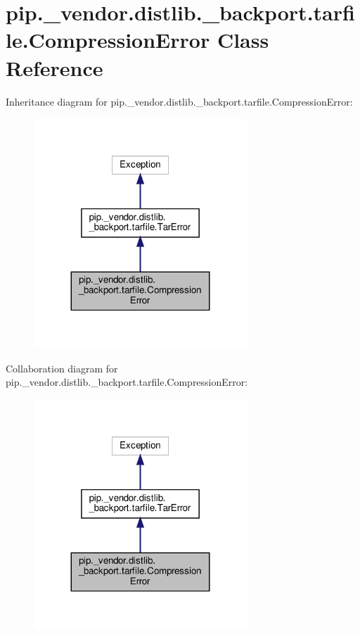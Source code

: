 \hypertarget{classpip_1_1__vendor_1_1distlib_1_1__backport_1_1tarfile_1_1CompressionError}{}\section{pip.\+\_\+vendor.\+distlib.\+\_\+backport.\+tarfile.\+Compression\+Error Class Reference}
\label{classpip_1_1__vendor_1_1distlib_1_1__backport_1_1tarfile_1_1CompressionError}


Inheritance diagram for pip.\+\_\+vendor.\+distlib.\+\_\+backport.\+tarfile.\+Compression\+Error\+:
\nopagebreak
\begin{figure}[H]
\begin{center}
\leavevmode
\includegraphics[width=227pt]{classpip_1_1__vendor_1_1distlib_1_1__backport_1_1tarfile_1_1CompressionError__inherit__graph}
\end{center}
\end{figure}


Collaboration diagram for pip.\+\_\+vendor.\+distlib.\+\_\+backport.\+tarfile.\+Compression\+Error\+:
\nopagebreak
\begin{figure}[H]
\begin{center}
\leavevmode
\includegraphics[width=227pt]{classpip_1_1__vendor_1_1distlib_1_1__backport_1_1tarfile_1_1CompressionError__coll__graph}
\end{center}
\end{figure}


